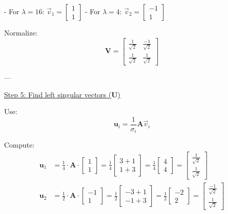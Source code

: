 - For \(\lambda = 16\): \(\vec{v}_1 = \begin{bmatrix} 1 \\ 1 \end{bmatrix}\)
- For \(\lambda = 4\): \(\vec{v}_2 = \begin{bmatrix} -1 \\ 1 \end{bmatrix}\)

Normalize:
\[
\textbf{V} =
\begin{bmatrix}
\frac{1}{\sqrt{2}} & \frac{-1}{\sqrt{2}} \\
\frac{1}{\sqrt{2}} & \frac{1}{\sqrt{2}}
\end{bmatrix}
\]

---

\underline{Step 5: Find left singular vectors (\(\textbf{U}\))}

Use:
\[
\textbf{u}_i = \frac{1}{\sigma_i} \textbf{A} \vec{v}_i
\]

Compute:
\begin{align*}
\textbf{u}_1 &= \frac{1}{4} \cdot \textbf{A} \cdot 
\begin{bmatrix}
1 \\
1
\end{bmatrix}
= \frac{1}{4} 
\begin{bmatrix}
3 + 1 \\
1 + 3
\end{bmatrix}
= \frac{1}{4}
\begin{bmatrix}
4 \\
4
\end{bmatrix}
= 
\begin{bmatrix}
\frac{1}{\sqrt{2}} \\
\frac{1}{\sqrt{2}}
\end{bmatrix}
\\
\textbf{u}_2 &= \frac{1}{2} \cdot \textbf{A} \cdot 
\begin{bmatrix}
-1 \\
1
\end{bmatrix}
= \frac{1}{2}
\begin{bmatrix}
-3 + 1 \\
-1 + 3
\end{bmatrix}
=
\frac{1}{2}
\begin{bmatrix}
-2 \\
2
\end{bmatrix}
=
\begin{bmatrix}
\frac{-1}{\sqrt{2}} \\
\frac{1}{\sqrt{2}}
\end{bmatrix}
\end{align*}

